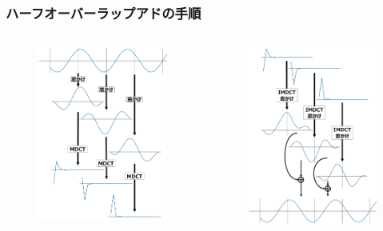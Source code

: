 \documentclass[14pt,xcolor=dvipsnames,table,dvipdfmx]{beamer}
\begin{document}
\begin{frame}[c]
    \frametitle{ハーフオーバーラップアドの手順}
    \vspace*{-25pt}
    \begin{columns}
        \begin{column}{0.5\textwidth}
            \begin{figure}
                \includegraphics[width=60mm]{./figs/halft_overlap_add_encode.png}
            \end{figure}
        \end{column}
        \begin{column}{0.5\textwidth}
            \begin{figure}
                \includegraphics[width=60mm]{./figs/halft_overlap_add_decode.png}
            \end{figure}
        \end{column}
    \end{columns}
\end{frame}
\end{document}
